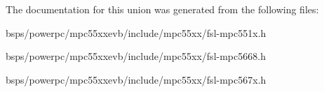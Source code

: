 The documentation for this union was generated from the following files\+:\begin{DoxyCompactItemize}
\item 
bsps/powerpc/mpc55xxevb/include/mpc55xx/fsl-\/mpc551x.\+h\item 
bsps/powerpc/mpc55xxevb/include/mpc55xx/fsl-\/mpc5668.\+h\item 
bsps/powerpc/mpc55xxevb/include/mpc55xx/fsl-\/mpc567x.\+h\end{DoxyCompactItemize}
